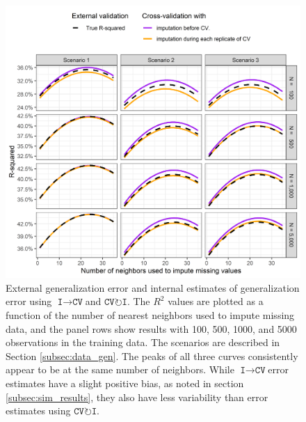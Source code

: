 \documentclass[AMA,STIX1COL,doublespace]{WileyNJD-v2}
\begin{document}
\begin{figure}
\includegraphics[width=1\linewidth]{figs/fig_trends_by_nbrs} 
\caption{External generalization error and internal estimates of generalization error using $\texttt{I}\!\!\rightarrow\!\texttt{CV}$\space and $\texttt{CV}\!\circlearrowright\!\texttt{I}$. The $R^2$ values are plotted as a function of the number of nearest neighbors used to impute missing data, and the panel rows show results with 100, 500, 1000, and 5000 observations in the training data. The scenarios are described in Section \ref{subsec:data_gen}. The peaks of all three curves consistently appear to be at the same number of neighbors. While $\texttt{I}\!\!\rightarrow\!\texttt{CV}$\space error estimates have a slight positive bias, as noted in section \ref{subsec:sim_results}, they also have less variability than error estimates using $\texttt{CV}\!\circlearrowright\!\texttt{I}$.}
\label{fig:sim_r2}
\end{figure}

\FloatBarrier
\end{document}
